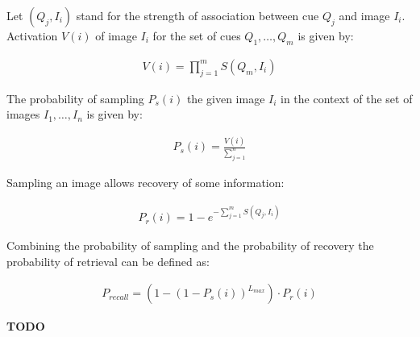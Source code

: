 \documentclass[a4paper]{article}
\begin{document}
Let $(Q_j, I_i)$ stand for the strength of association between cue $Q_j$ and image $I_i$. Activation
$V(i)$ of image $I_i$ for the set of cues $Q_1,\ldots, Q_m$ is given by:

\begin{align}
V(i) = \prod_{j=1}^m S(Q_m, I_i)
\end{align}

The probability of sampling $P_s(i)$ the given image $I_i$ in the context of the set of
images $I_1, \ldots, I_n$ is given by:

\begin{align}
P_s(i) = \frac{V(i)}{\sum_{j=1}^{n}}
\end{align}

Sampling an image allows recovery of some information:

\begin{align}
P_r(i) = 1 - e^{-\sum_{j=1}^mS\left(Q_j, I_i\right)}
\end{align}

Combining the probability of sampling and the probability of recovery the probability of retrieval
can be defined as:

\begin{align}
P_{recall} = \left(1 - \left(1 - P_s(i)\right)^{L_{max}}\right) \cdot P_r(i)
\end{align}

{\textbf{TODO}}


\nocite{*}

\end{document}
